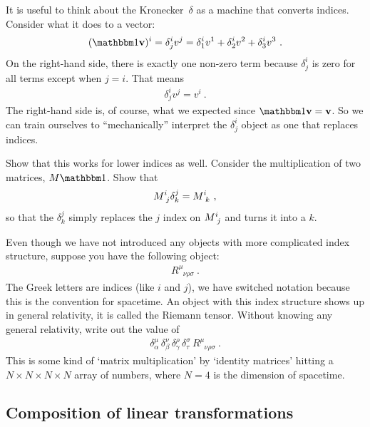 \documentclass[12pt]{article}
\begin{document}
It is useful to think about the Kronecker~$\delta$ as a machine that converts indices. Consider what it does to a vector:
\begin{align}
    (\one \vec{v})^i = \delta^i_j v^j = 
    \delta^i_1v^1 + \delta^i_2v^2 + \delta^i_3v^3 \ .
\end{align}
On the right-hand side, there is exactly one non-zero term because $\delta^i_j$ is zero for all terms except when $j=i$. That means 
\begin{align}
    \delta^i_j v^j = v^i \ .
    \label{eq:kronecker:delta:action}
\end{align}
The right-hand side is, of course, what we expected since $\one \vec{v} = \vec{v}$. So we can train ourselves to ``mechanically'' interpret the $\delta^i_j$ object as one that replaces indices. 
\begin{exercise}
Show that this works for lower indices as well. Consider the multiplication of two matrices, $M\one $. Show that
\begin{align}
    M\aij{i}{j}\delta^j_k = M\aij{i}{k} \ ,
\end{align}
so that the $\delta^j_k$ simply replaces the $j$ index on $M\aij{i}{j}$ and turns it into a $k$.
\end{exercise}
\begin{exercise}
Even though we have not introduced any objects with more complicated index structure, suppose you have the following object: 
\begin{align}
    R^\mu_{\phantom{\mu}\nu\rho\sigma} \ .
\end{align}
The Greek letters are indices (like $i$ and $j$), we have switched notation because this is the convention for spacetime. An object with this index structure shows up in general relativity, it is called the Riemann tensor. Without knowing any general relativity, write out the value of
\begin{align}
    \delta^\mu_\alpha\,
    \delta^\nu_\beta\,
    \delta^\rho_\gamma\,
    \delta^\sigma_\tau\,
    R^\mu_{\phantom{\mu}\nu\rho\sigma} \ .
\end{align}
This is some kind of `matrix multiplication' by `identity matrices' hitting a $N\times N\times N\times N$ array of numbers, where $N=4$ is the dimension of spacetime. 
\end{exercise}

\subsection{Composition of linear transformations}
\end{document}
